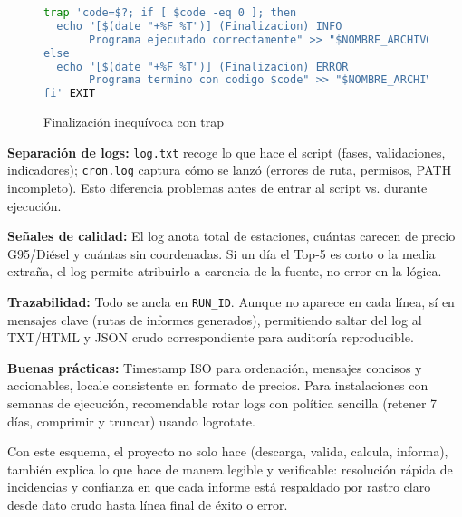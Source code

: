 \begin{figure}[H]
  \footnotesize
  \begin{lstlisting}[language=bash]
trap 'code=$?; if [ $code -eq 0 ]; then
  echo "[$(date "+%F %T")] (Finalizacion) INFO 
       Programa ejecutado correctamente" >> "$NOMBRE_ARCHIVO_LOG"
else
  echo "[$(date "+%F %T")] (Finalizacion) ERROR 
       Programa termino con codigo $code" >> "$NOMBRE_ARCHIVO_LOG"
fi' EXIT
\end{lstlisting}
  \caption{Finalización inequívoca con trap}
\end{figure}

\textbf{Separación de logs:} \texttt{log.txt} recoge lo que hace el script (fases, validaciones, indicadores); \texttt{cron.log} captura cómo se lanzó (errores de ruta, permisos, PATH incompleto). Esto diferencia problemas antes de entrar al script vs. durante ejecución.

\textbf{Señales de calidad:} El log anota total de estaciones, cuántas carecen de precio G95/Diésel y cuántas sin coordenadas. Si un día el Top-5 es corto o la media extraña, el log permite atribuirlo a carencia de la fuente, no error en la lógica.

\textbf{Trazabilidad:} Todo se ancla en \texttt{RUN\_ID}. Aunque no aparece en cada línea, sí en mensajes clave (rutas de informes generados), permitiendo saltar del log al TXT/HTML y JSON crudo correspondiente para auditoría reproducible.

\textbf{Buenas prácticas:} Timestamp ISO para ordenación, mensajes concisos y accionables, locale consistente en formato de precios. Para instalaciones con semanas de ejecución, recomendable rotar logs con política sencilla (retener 7 días, comprimir y truncar) usando logrotate.

Con este esquema, el proyecto no solo hace (descarga, valida, calcula, informa), también explica lo que hace de manera legible y verificable: resolución rápida de incidencias y confianza en que cada informe está respaldado por rastro claro desde dato crudo hasta línea final de éxito o error.
